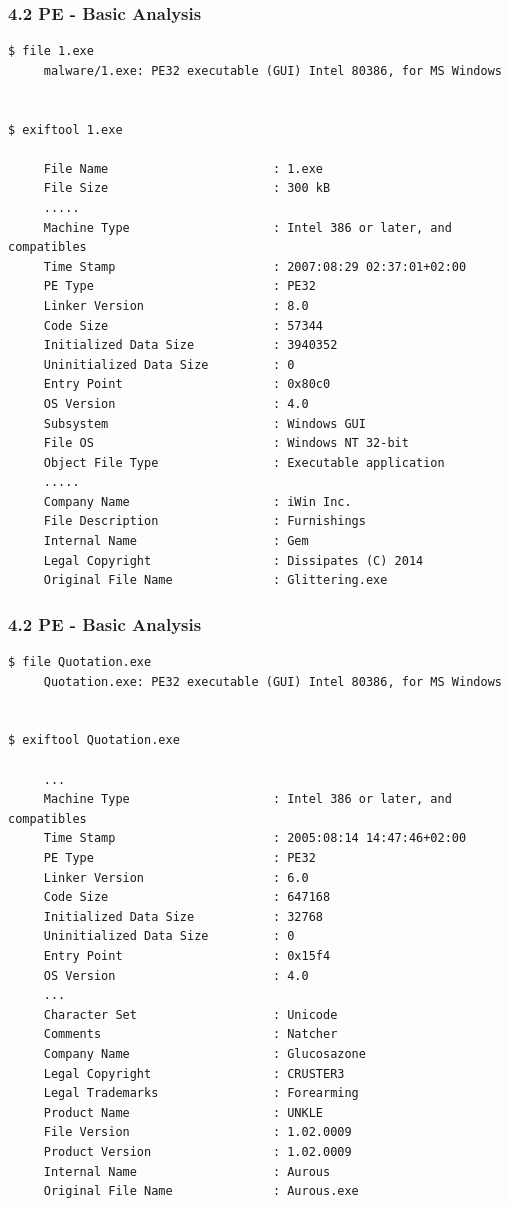 \begin{frame}[fragile]
  \frametitle{4.2 PE - Basic Analysis}
  \begin{lstlisting}[basicstyle=\tiny]
$ file 1.exe 
     malware/1.exe: PE32 executable (GUI) Intel 80386, for MS Windows


$ exiftool 1.exe

     File Name                       : 1.exe
     File Size                       : 300 kB
     .....
     Machine Type                    : Intel 386 or later, and compatibles
     Time Stamp                      : 2007:08:29 02:37:01+02:00
     PE Type                         : PE32
     Linker Version                  : 8.0
     Code Size                       : 57344
     Initialized Data Size           : 3940352
     Uninitialized Data Size         : 0
     Entry Point                     : 0x80c0
     OS Version                      : 4.0
     Subsystem                       : Windows GUI
     File OS                         : Windows NT 32-bit
     Object File Type                : Executable application
     .....
     Company Name                    : iWin Inc.
     File Description                : Furnishings
     Internal Name                   : Gem
     Legal Copyright                 : Dissipates (C) 2014
     Original File Name              : Glittering.exe
  \end{lstlisting}
\end{frame}


\begin{frame}[fragile]
  \frametitle{4.2 PE - Basic Analysis}
  \begin{lstlisting}[basicstyle=\tiny]
$ file Quotation.exe 
     Quotation.exe: PE32 executable (GUI) Intel 80386, for MS Windows


$ exiftool Quotation.exe
  
     ...
     Machine Type                    : Intel 386 or later, and compatibles
     Time Stamp                      : 2005:08:14 14:47:46+02:00
     PE Type                         : PE32
     Linker Version                  : 6.0
     Code Size                       : 647168
     Initialized Data Size           : 32768
     Uninitialized Data Size         : 0
     Entry Point                     : 0x15f4
     OS Version                      : 4.0
     ...  
     Character Set                   : Unicode
     Comments                        : Natcher
     Company Name                    : Glucosazone
     Legal Copyright                 : CRUSTER3
     Legal Trademarks                : Forearming
     Product Name                    : UNKLE
     File Version                    : 1.02.0009
     Product Version                 : 1.02.0009
     Internal Name                   : Aurous
     Original File Name              : Aurous.exe
  \end{lstlisting}
\end{frame}


